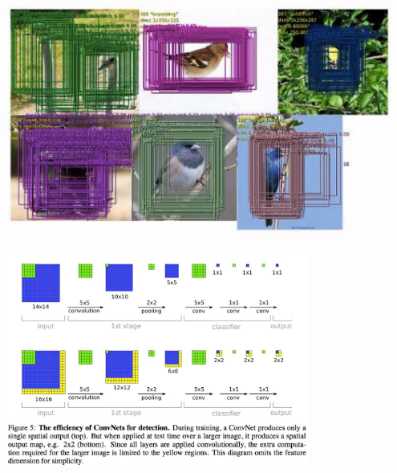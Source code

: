 \documentclass[xetex,mathserif,serif,aspectratio=169]{beamer}
\begin{document}
\begin{frame}[fragile] \frametitle{} \oldB \small

\begin{center}
\includegraphics[width=0.95\textwidth]{img/overFeatLocalMore.jpg}
\end{center}

\end{frame}

\begin{frame}[fragile] \frametitle{} \oldB \small

\begin{center}
\includegraphics[width=0.75\textwidth]{img/overFeatIdea.jpg}
\end{center}

\end{frame}

\begin{frame}[fragile] \frametitle{} \oldB \small

\textbf{}

\end{frame}
\end{document}
